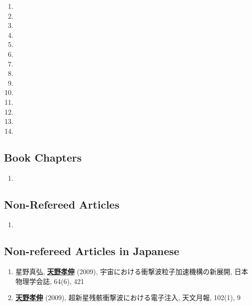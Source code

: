 \documentclass[lualatex,a4paper,ja=standard]{scrartcl}
\newcommand{\NewSubPart}[1]{\subsection*{#1}}
\newcommand{\self}[1]{\textbf{\underline{#1}}}
\begin{document}
\begin{enumerate}
\item {} 
\item {} 
\item {} 
\item {} 
\item {} 
\item {} 
\item {} 
\item {} 
\item {} 
\item {} 
\item {} 
\item {} 
\item {} 
\item {} 
\end{enumerate}

\NewSubPart{Book Chapters}
\begin{enumerate}
\item {}
\end{enumerate}

\NewSubPart{Non-Refereed Articles}
\begin{enumerate}
\item {}
\end{enumerate}

\NewSubPart{Non-refereed Articles in Japanese}
\begin{enumerate}
\item 星野真弘, \self{天野孝伸} (2009), 宇宙における衝撃波粒子加速機構の新展開, 日本物理学会誌, 64(6), 421
\item \self{天野孝伸} (2009), 超新星残骸衝撃波における電子注入, 天文月報, 102(1), 9
\end{enumerate}
\end{document}
